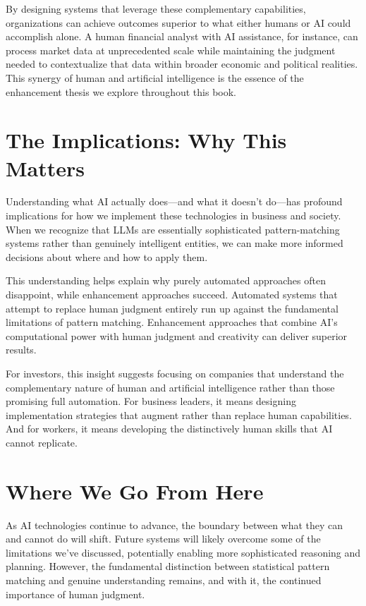 \documentclass[
  Letterpaper,
]{scrbook}
\begin{document}
By designing systems that leverage these complementary capabilities,
organizations can achieve outcomes superior to what either humans or AI
could accomplish alone. A human financial analyst with AI assistance,
for instance, can process market data at unprecedented scale while
maintaining the judgment needed to contextualize that data within
broader economic and political realities. This synergy of human and
artificial intelligence is the essence of the enhancement thesis we
explore throughout this book.

\section{The Implications: Why This
Matters}\label{the-implications-why-this-matters}

Understanding what AI actually does---and what it doesn't do---has
profound implications for how we implement these technologies in
business and society. When we recognize that LLMs are essentially
sophisticated pattern-matching systems rather than genuinely intelligent
entities, we can make more informed decisions about where and how to
apply them.

This understanding helps explain why purely automated approaches often
disappoint, while enhancement approaches succeed. Automated systems that
attempt to replace human judgment entirely run up against the
fundamental limitations of pattern matching. Enhancement approaches that
combine AI's computational power with human judgment and creativity can
deliver superior results.

For investors, this insight suggests focusing on companies that
understand the complementary nature of human and artificial intelligence
rather than those promising full automation. For business leaders, it
means designing implementation strategies that augment rather than
replace human capabilities. And for workers, it means developing the
distinctively human skills that AI cannot replicate.

\section{Where We Go From Here}\label{where-we-go-from-here}

As AI technologies continue to advance, the boundary between what they
can and cannot do will shift. Future systems will likely overcome some
of the limitations we've discussed, potentially enabling more
sophisticated reasoning and planning. However, the fundamental
distinction between statistical pattern matching and genuine
understanding remains, and with it, the continued importance of human
judgment.
\end{document}
